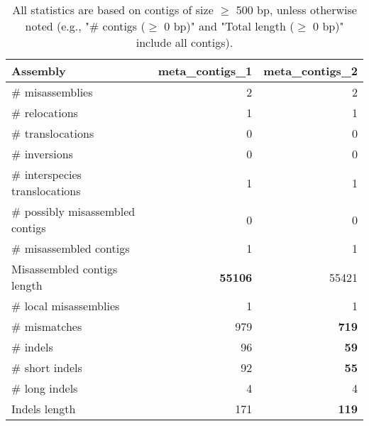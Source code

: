 \documentclass[12pt,a4paper]{article}
\begin{document}
\begin{table}[ht]
\begin{center}
\caption{All statistics are based on contigs of size $\geq$ 500 bp, unless otherwise noted (e.g., "\# contigs ($\geq$ 0 bp)" and "Total length ($\geq$ 0 bp)" include all contigs).}
\begin{tabular}{|l*{2}{|r}|}
\hline
Assembly & meta\_contigs\_1 & meta\_contigs\_2 \\ \hline
\# misassemblies & 2 & 2 \\ \hline
\hspace{5mm}\# relocations & 1 & 1 \\ \hline
\hspace{5mm}\# translocations & 0 & 0 \\ \hline
\hspace{5mm}\# inversions & 0 & 0 \\ \hline
\hspace{5mm}\# interspecies translocations & 1 & 1 \\ \hline
\# possibly misassembled contigs & 0 & 0 \\ \hline
\# misassembled contigs & 1 & 1 \\ \hline
Misassembled contigs length & {\bf 55106} & 55421 \\ \hline
\# local misassemblies & 1 & 1 \\ \hline
\# mismatches & 979 & {\bf 719} \\ \hline
\# indels & 96 & {\bf 59} \\ \hline
\hspace{5mm}\# short indels & 92 & {\bf 55} \\ \hline
\hspace{5mm}\# long indels & 4 & 4 \\ \hline
Indels length & 171 & {\bf 119} \\ \hline
\end{tabular}
\end{center}
\end{table}
\end{document}
